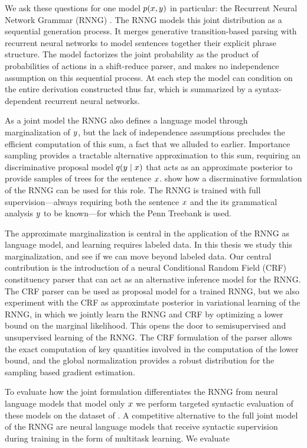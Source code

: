   We ask these questions for one model $p(x, y)$ in particular: the Recurrent Neural Network Grammar (RNNG) \citep{dyer2016rnng}. The RNNG models this joint distribution as a sequential generation process. It merges generative transition-based parsing with recurrent neural networks to model sentences together their explicit phrase structure. The model factorizes the joint probability as the product of probabilities of actions in a shift-reduce parser, and makes no independence assumption on this sequential process. At each step the model can condition on the entire derivation constructed thus far, which is summarized by a syntax-dependent recurrent neural networks.

  As a joint model the RNNG also defines a language model through marginalization of $y$, but the lack of independence assumptions precludes the efficient computation of this sum, a fact that we alluded to earlier. Importance sampling provides a tractable alternative approximation to this sum, requiring an discriminative proposal model $q(y \mid x)$ that acts as an approximate posterior to provide samples of trees for the sentence $x$. \citet{dyer2016rnng} show how a discrminative formulation of the RNNG can be used for this role. The RNNG is trained with full supervision---always requiring both the sentence $x$ and the its grammatical analysis $y$ to be known---for which the Penn Treebank \citep{marcus1993penn} is used.

  The approximate marginalization is central in the application of the RNNG as language model, and learning requires labeled data. In this thesis we study this marginalization, and see if we can move beyond labeled data. Our central contribution is the introduction of a neural Conditional Random Field (CRF) constituency parser that can act as an alternative inference model for the RNNG. The CRF parser can be used as proposal model for a trained RNNG, but we also experiment with the CRF as approximtate posterior in variational learning of the RNNG, in which we jointly learn the RNNG and CRF by optimizing a lower bound on the marginal likelihood. This opens the door to semisupervised and unsupervised learning of the RNNG. The CRF formulation of the parser allows the exact computation of key quantities involved in the computation of the lower bound, and the global normalization provides a robust distribution for the sampling based gradient estimation.

  To evaluate how the joint formulation differentiates the RNNG from neural language models that model only $x$ we perform targeted syntactic evaluation of these models on the dataset of \citep{linzen2018targeted}. A competitive alternative to the full joint model of the RNNG are neural language models that receive syntactic supervision during training in the form of multitask learning. We evaluate 

